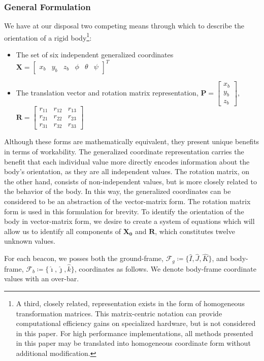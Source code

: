 \documentclass{report}
\begin{document}
				\subsubsection{General Formulation}
					We have at our disposal two competing means through which to describe the orientation of a rigid body\footnote{A third, closely related, representation exists in the form of homogeneous transformation matrices. This matrix-centric notation can provide computational efficiency gains on specialized hardware, but is not considered in this paper. For high performance implementations, all methods presented in this paper may be translated into homogeneous coordinate form without additional modification.}:
					\begin{itemize}
						\item The set of six independent generalized coordinates $\mathbf{X}=\begin{bmatrix}x_b & y_b & z_b & \phi & \theta & \psi\end{bmatrix}^T$
						\item The translation vector and rotation matrix representation, $\mathbf{P}=\begin{bmatrix}x_b \\ y_b \\ z_b\end{bmatrix}$, $\mathbf{R}=\begin{bmatrix}r_{11} & r_{12} & r_{13} \\ r_{21} & r_{22} & r_{23} \\ r_{31} & r_{32} & r_{33} \end{bmatrix}$
					\end{itemize}
					Although these forms are mathematically equivalent, they present unique benefits in terms of workability. The generalized coordinate representation carries the benefit that each individual value more directly encodes information about the body's orientation, as they are all independent values. The rotation matrix, on the other hand, consists of non-independent values, but is more closely related to the behavior of the body. In this way, the generalized coordinates can be considered to be an abstraction of the vector-matrix form. The rotation matrix form is used in this formulation for brevity. To identify the orientation of the body in vector-matrix form, we desire to create a system of equations which will allow us to identify all components of $\mathbf{X_0}$ and $\mathbf{R}$, which constitutes twelve unknown values.\par
					For each beacon, we posses both the ground-frame, $\mathcal{F}_g\coloneqq\{\hat{I}, \hat{J}, \hat{K}\}$, and body-frame, $\mathcal{F}_b\coloneqq\{\hat{\imath}, \hat{\jmath}, \hat{k}\}$, coordinates as follows. We denote body-frame coordinate values with an over-bar.
\end{document}
